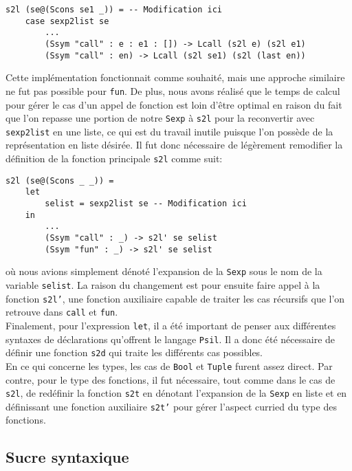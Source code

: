 \documentclass[11pt, titlepage]{article}
\begin{document}
\begin{lstlisting}
s2l (se@(Scons se1 _)) = -- Modification ici
    case sexp2list se
        ...
        (Ssym "call" : e : e1 : []) -> Lcall (s2l e) (s2l e1)
        (Ssym "call" : en) -> Lcall (s2l se1) (s2l (last en))
\end{lstlisting}

Cette implémentation fonctionnait comme souhaité, mais une approche similaire
ne fut pas possible pour \texttt{fun}. De plus, nous avons réalisé que le temps
de calcul pour gérer le cas d'un appel de fonction est loin d'être optimal en
raison du fait que l'on repasse une portion de notre \texttt{Sexp} à
\texttt{s2l} pour la reconvertir avec \texttt{sexp2list} en une liste, ce qui
est du travail inutile puisque l'on possède de la représentation en liste
désirée. Il fut donc nécessaire de légèrement remodifier la définition de la
fonction principale \texttt{s2l} comme suit:
\begin{lstlisting}
s2l (se@(Scons _ _)) =
    let
        selist = sexp2list se -- Modification ici
    in
        ...
        (Ssym "call" : _) -> s2l' se selist
        (Ssym "fun" : _) -> s2l' se selist
\end{lstlisting}

où nous avions simplement dénoté l'expansion de la \texttt{Sexp} sous le nom de
la variable \texttt{selist}. La raison du changement est pour ensuite faire
appel à la fonction \texttt{s2l'}, une fonction auxiliaire capable de traiter
les cas récursifs que l'on retrouve dans \texttt{call} et \texttt{fun}. \\
Finalement, pour l'expression \texttt{let}, il a été important de penser aux
différentes syntaxes de déclarations qu'offrent le langage \texttt{Psil}. Il a
donc été nécessaire de définir une fonction \texttt{s2d} qui traite les
différents cas possibles. \\

En ce qui concerne les types, les cas de \texttt{Bool} et \texttt{Tuple} furent
assez direct. Par contre, pour le type des fonctions, il fut nécessaire, tout
comme dans le cas de \texttt{s2l}, de redéfinir la fonction \texttt{s2t} en
dénotant l'expansion de la \texttt{Sexp} en liste et en définissant une
fonction auxiliaire \texttt{s2t'} pour gérer l'aspect curried du type des
fonctions.

\subsection{Sucre syntaxique}
\end{document}
